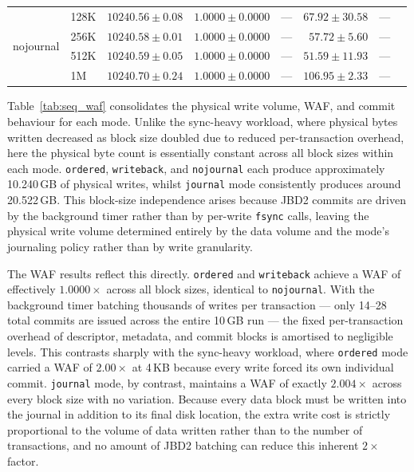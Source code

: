 \documentclass[12pt,a4paper]{article}
\begin{document}
\begin{table}[H]
{\begin{tabular}{llrrrrrr}
\midrule
\multirow{4}{*}{nojournal}
  & 128K & $10240.56 \pm 0.08$ & $1.0000 \pm 0.0000$ & --- & $67.92  \pm 30.58$ & --- \\
  & 256K & $10240.58 \pm 0.01$ & $1.0000 \pm 0.0000$ & --- & $57.72  \pm  5.60$ & --- \\
  & 512K & $10240.59 \pm 0.05$ & $1.0000 \pm 0.0000$ & --- & $51.59  \pm 11.93$ & --- \\
  & 1M   & $10240.70 \pm 0.24$ & $1.0000 \pm 0.0000$ & --- & $106.95 \pm  2.33$ & --- \\
\bottomrule
\end{tabular}%
}
\end{table}

Table~\ref{tab:seq_waf} consolidates the physical write volume, WAF, and commit
behaviour for each mode. Unlike the sync-heavy workload, where physical bytes written
decreased as block size doubled due to reduced per-transaction overhead, here the
physical byte count is essentially constant across all block sizes within each mode.
\texttt{ordered}, \texttt{writeback}, and \texttt{nojournal} each produce approximately
10.240\,GB of physical writes, whilst \texttt{journal} mode consistently produces
around 20.522\,GB. This block-size independence arises because JBD2 commits are driven
by the background timer rather than by per-write \texttt{fsync} calls, leaving the
physical write volume determined entirely by the data volume and the mode's journaling
policy rather than by write granularity.

The WAF results reflect this directly. \texttt{ordered} and \texttt{writeback} achieve
a WAF of effectively $1.0000\times$ across all block sizes, identical to
\texttt{nojournal}. With the background timer batching thousands of writes per
transaction --- only 14--28 total commits are issued across the entire 10\,GB run ---
the fixed per-transaction overhead of descriptor, metadata, and commit blocks is
amortised to negligible levels. This contrasts sharply with the sync-heavy workload,
where \texttt{ordered} mode carried a WAF of $2.00\times$ at 4\,KB because every
write forced its own individual commit. \texttt{journal} mode, by contrast, maintains a
WAF of exactly $2.004\times$ across every block size with no variation. Because every
data block must be written into the journal in addition to its final disk location, the
extra write cost is strictly proportional to the volume of data written rather than to
the number of transactions, and no amount of JBD2 batching can reduce this inherent
$2\times$ factor.
\end{document}
